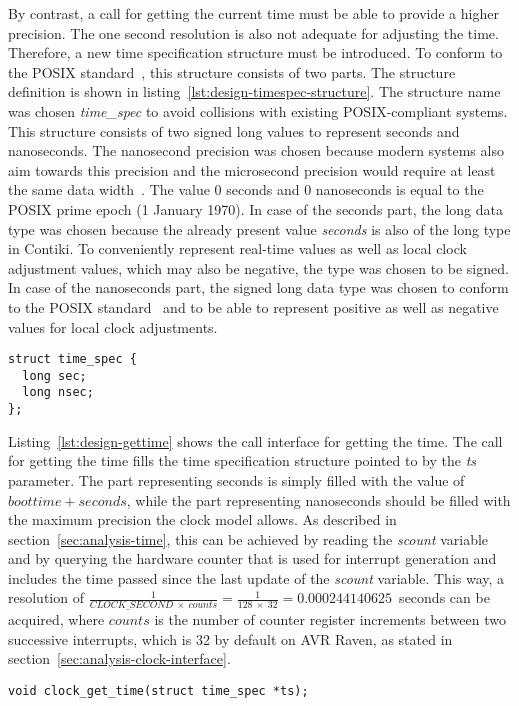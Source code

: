 By contrast, a call for getting the current time must be able to provide a higher precision.
The one second resolution is also not adequate for adjusting the time.
Therefore, a new time specification structure must be introduced.
To conform to the POSIX standard~\cite{posix}, this structure consists of two parts.
The structure definition is shown in listing~\ref{lst:design-timespec-structure}.
The structure name was chosen {\it{time\_spec}} to avoid collisions with existing POSIX-compliant systems.
This structure consists of two signed long values to represent seconds and nanoseconds.
The nanosecond precision was chosen because modern systems also aim towards this precision
and the microsecond precision would require at least the same data width~\cite{posix,ntp-precision}.
The value 0 seconds and 0 nanoseconds is equal to the POSIX prime epoch (1 January 1970).
In case of the seconds part, the long data type was chosen
because the already present value {\it{seconds}} is also of the long type in Contiki.
To conveniently represent real-time values as well as local clock adjustment values, which may also be negative,
the type was chosen to be signed.
In case of the nanoseconds part, the signed long data type was chosen
to conform to the POSIX standard~\cite{posix}
and to be able to represent positive as well as negative values for local clock adjustments.
\begin{lstlisting}[caption={Time specification structure},label={lst:design-timespec-structure}]
struct time_spec {
  long sec;
  long nsec;
};
\end{lstlisting}

Listing~\ref{lst:design-gettime} shows the call interface for getting the time.
The call for getting the time fills the time specification structure
pointed to by the {\it{ts}} parameter.
The part representing seconds is simply filled with the value of $boottime + seconds$,
while the part representing nanoseconds should be filled with the maximum precision
the clock model allows.
As described in section~\ref{sec:analysis-time},
this can be achieved by reading the {\it{scount}} variable
and by querying the hardware counter that is used for
interrupt generation and includes the time passed since
the last update of the {\it{scount}} variable.
This way, a resolution of
$\frac{1}{CLOCK\_SECOND~\times~counts} = \frac{1}{128~\times~32} = 0.000244140625$~seconds
can be acquired,
where $counts$ is the number of counter register increments between two successive interrupts,
which is 32 by default on AVR Raven, as stated in section~\ref{sec:analysis-clock-interface}.
\begin{lstlisting}[caption={Call interface for getting the time},label={lst:design-gettime}]
void clock_get_time(struct time_spec *ts);
\end{lstlisting}

